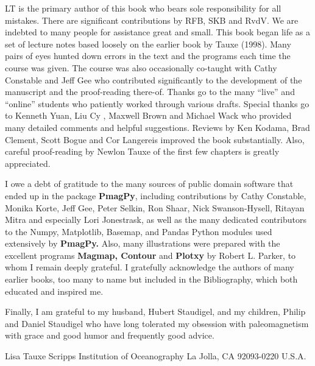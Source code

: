 LT is the primary author of this book who bears sole responsibility for all mistakes.  There are significant contributions by RFB, SKB and RvdV.     We are indebted to many people for assistance
great and small.  This book began life as a set of lecture notes based loosely on the earlier book by Tauxe (1998).  Many pairs of
eyes hunted down errors  in the text
and  the programs each time the course was given.  The course was also occasionally co-taught with Cathy Constable and Jeff Gee who contributed significantly to  the development of the manuscript and the proof-reading there-of.   Thanks go to the many ``live'' and ``online'' students who patiently worked through various drafts.  Special thanks go to Kenneth Yuan,  Liu Cy , Maxwell Brown and Michael Wack who provided many detailed comments and helpful suggestions.   Reviews by Ken Kodama, Brad Clement, Scott Bogue and Cor Langereis improved the book substantially.   Also, careful proof-reading by Newlon Tauxe of the first few chapters is greatly appreciated.


I owe a debt of gratitude to the many sources of public domain software that
ended up in the package {\bf PmagPy}, including contributions by  Cathy Constable, Monika Korte, Jeff Gee, Peter Selkin,  Ron Shaar, Nick Swanson-Hysell,  Ritayan Mitra and especially Lori Jonestrask,  as well as the many dedicated contributors to the Numpy, Matplotlib,  Basemap, and Pandas  Python modules used extensively by {\bf PmagPy.}  Also, many illustrations were prepared with the excellent programs {\bf Magmap, Contour} and {\bf Plotxy} by Robert L. Parker, to whom I remain deeply grateful.  
I  gratefully acknowledge   the authors of many earlier  books, too many to name but included in the Bibliography,  which both educated and inspired me.


Finally, I am   grateful to my husband, Hubert Staudigel,  and my children, Philip and Daniel Staudigel who have long tolerated my obsession with paleomagnetism with grace and good humor and frequently good advice. 



\vskip 18pt
{\obeylines
Lisa Tauxe
Scripps Institution of Oceanography
La Jolla, CA 92093-0220
U.S.A.
}



